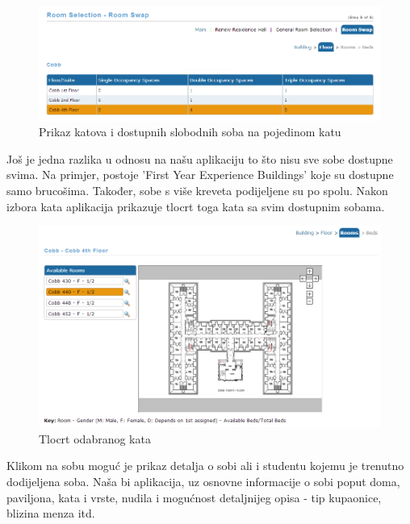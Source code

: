 		\begin{figure}[H]
			\includegraphics[width=.7\linewidth]{slike/rs8.png} %
			\centering
			\caption{Prikaz katova i dostupnih slobodnih soba na pojedinom katu}
			\label{fig:promjene} %
		\end{figure}
	
		Još je jedna razlika u odnosu na našu aplikaciju to što nisu sve sobe dostupne svima. Na primjer, postoje 'First Year Experience Buildings' koje su dostupne samo brucošima. Također, sobe s više kreveta podijeljene su po spolu. 
		Nakon izbora kata aplikacija prikazuje tlocrt toga kata sa svim dostupnim sobama. 
		
		\begin{figure}[H]
			\includegraphics[scale=0.4]{slike/rs9.png} %
			\centering
			\caption{Tlocrt odabranog kata}
			\label{fig:promjene2}
		\end{figure}
	
		Klikom na sobu moguć je prikaz detalja o sobi ali i studentu kojemu je trenutno dodijeljena soba. Naša bi aplikacija, uz osnovne informacije o sobi poput doma, paviljona, kata i vrste, nudila i mogućnost detaljnijeg opisa - tip kupaonice, blizina menza itd. 
		
